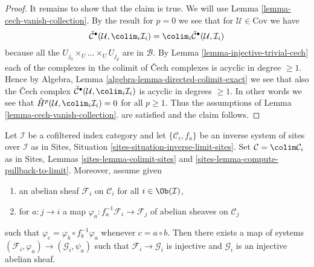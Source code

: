 \begin{proof}
\medskip\noindent
It remains to show that the claim is true. We will use
Lemma \ref{lemma-cech-vanish-collection}.
By the result for $p = 0$ we see that for $\mathcal{U} \in \text{Cov}$
we have
$$
\check{\mathcal{C}}^\bullet(\mathcal{U}, \colim_i \mathcal{I}_i)
=
\colim_i \check{\mathcal{C}}^\bullet(\mathcal{U}, \mathcal{I}_i)
$$
because all the $U_{j_0} \times_U \ldots \times_U U_{j_p}$
are in $\mathcal{B}$. By
Lemma \ref{lemma-injective-trivial-cech}
each of the complexes in the colimit of {\v C}ech complexes is
acyclic in degree $\geq 1$. Hence by
Algebra, Lemma \ref{algebra-lemma-directed-colimit-exact}
we see that also the {\v C}ech complex
$\check{\mathcal{C}}^\bullet(\mathcal{U}, \colim_i \mathcal{I}_i)$
is acyclic in degrees $\geq 1$. In other words we see that
$\check{H}^p(\mathcal{U}, \colim_i \mathcal{I}_i) = 0$
for all $p \geq 1$. Thus the assumptions of
Lemma \ref{lemma-cech-vanish-collection}.
are satisfied and the claim follows.
\end{proof}

\begin{lemma}
\label{lemma-colim-sites-injective}
Let $\mathcal{I}$ be a cofiltered index category and let
$\{\mathcal{C}_i, f_a\}$ be an inverse system of sites over $\mathcal{I}$
as in Sites, Situation \ref{sites-situation-inverse-limit-sites}.
Set $\mathcal{C} = \colim \mathcal{C}_i$ as in Sites,
Lemmas \ref{sites-lemma-colimit-sites} and
\ref{sites-lemma-compute-pullback-to-limit}.
Moreover, assume given
\begin{enumerate}
\item an abelian sheaf $\mathcal{F}_i$ on $\mathcal{C}_i$ for all
$i \in \Ob(\mathcal{I})$,
\item for $a : j \to i$ a map
$\varphi_a : f_a^{-1}\mathcal{F}_i \to \mathcal{F}_j$
of abelian sheaves on $\mathcal{C}_j$
\end{enumerate}
such that $\varphi_c = \varphi_b \circ f_b^{-1}\varphi_a$
whenever $c = a \circ b$. Then there exists a map of systems
$(\mathcal{F}_i, \varphi_a) \to (\mathcal{G}_i, \psi_a)$
such that $\mathcal{F}_i \to \mathcal{G}_i$ is injective and
$\mathcal{G}_i$ is an injective abelian sheaf.
\end{lemma}

